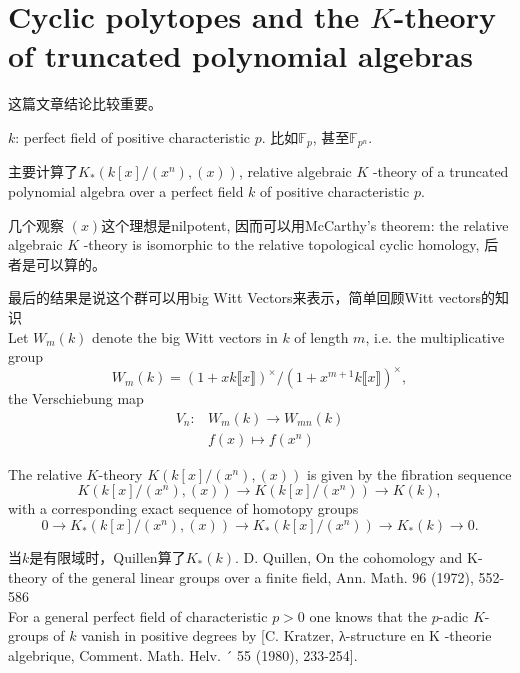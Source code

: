 \section{Cyclic polytopes and the $K$-theory of truncated polynomial algebras} %
\label{sec:cyclic_polytopes_and_the_k_theory_of_truncated_polynomial_algebras}

这篇文章结论比较重要。

$k$: perfect field of positive characteristic $p$. 比如$\mathbb{F}_p$, 甚至$\mathbb{F}_{p^n}$.

主要计算了$K_*(k[x]/(x^n),(x))$,  relative algebraic $K$ -theory of a truncated polynomial algebra over a perfect field $k$ of positive characteristic $p$.

几个观察 $(x)$这个理想是nilpotent, 因而可以用McCarthy's theorem: {\color{green}  the relative algebraic $K$ -theory is isomorphic to the relative topological cyclic homology}, 后者是可以算的。

最后的结果是说这个群可以用big Witt Vectors来表示，简单回顾Witt vectors的知识\\
Let $W_m(k)$ denote
the big Witt vectors in $k$ of length $m$, i.e. the multiplicative group
\[W_m(k) = (1 + xk\llbracket x\rrbracket )^{\times}/(1 + x^{m+1}k\llbracket x\rrbracket )^{\times},\]
the Verschiebung map
\begin{align*}
V_n \colon & W_m(k) \longrightarrow W_{mn}(k)\\
& f(x)\mapsto f(x^n)
\end{align*}

The relative $K$-theory $K (k[x]/(x^n),(x))$ is given by the fibration sequence
\[K (k[x]/(x^n), (x)) \longrightarrow K (k[x]/(x^n)) \longrightarrow K (k),\]
with a corresponding exact sequence of homotopy groups
\[0\longrightarrow K_*(k[x]/(x^n), (x)) \longrightarrow K_*(k[x]/(x^n)) \longrightarrow K_*(k)\longrightarrow 0.\]

当$k$是有限域时，Quillen算了$K_*(k)$. D. Quillen, On the cohomology and K-theory of the general linear groups over a finite
field, Ann. Math. 96 (1972), 552-586\\
For a general perfect field of characteristic $p > 0$ one knows that the $p$-adic $K$-groups of $k$ vanish in positive degrees by [C. Kratzer, λ-structure en K -theorie algebrique, Comment. Math. Helv. ´ 55 (1980), 233-254].

